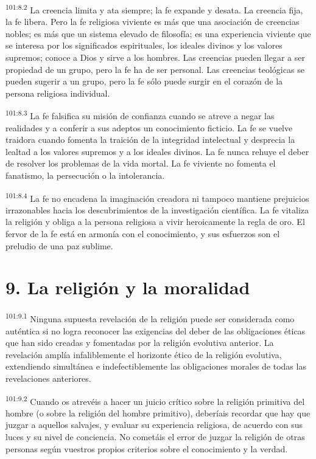 \par
\textsuperscript{101:8.2} La creencia limita y ata siempre; la fe expande y desata. La creencia fija, la fe libera. Pero la fe religiosa viviente es más que una asociación de creencias nobles; es más que un sistema elevado de filosofía; es una experiencia viviente que se interesa por los significados espirituales, los ideales divinos y los valores supremos; conoce a Dios y sirve a los hombres. Las creencias pueden llegar a ser propiedad de un grupo, pero la fe ha de ser personal. Las creencias teológicas se pueden sugerir a un grupo, pero la fe sólo puede surgir en el corazón de la persona religiosa individual.

\par
\textsuperscript{101:8.3} La fe falsifica su misión de confianza cuando se atreve a negar las realidades y a conferir a sus adeptos un conocimiento ficticio. La fe se vuelve traidora cuando fomenta la traición de la integridad intelectual y desprecia la lealtad a los valores supremos y a los ideales divinos. La fe nunca rehuye el deber de resolver los problemas de la vida mortal. La fe viviente no fomenta el fanatismo, la persecución o la intolerancia.

\par
\textsuperscript{101:8.4} La fe no encadena la imaginación creadora ni tampoco mantiene prejuicios irrazonables hacia los descubrimientos de la investigación científica. La fe vitaliza la religión y obliga a la persona religiosa a vivir heroicamente la regla de oro. El fervor de la fe está en armonía con el conocimiento, y sus esfuerzos son el preludio de una paz sublime.

\section*{9. La religión y la moralidad}
\par
\textsuperscript{101:9.1} Ninguna supuesta revelación de la religión puede ser considerada como auténtica si no logra reconocer las exigencias del deber de las obligaciones éticas que han sido creadas y fomentadas por la religión evolutiva anterior. La revelación amplía infaliblemente el horizonte ético de la religión evolutiva, extendiendo simultánea e indefectiblemente las obligaciones morales de todas las revelaciones anteriores.

\par
\textsuperscript{101:9.2} Cuando os atrevéis a hacer un juicio crítico sobre la religión primitiva del hombre (o sobre la religión del hombre primitivo), deberíais recordar que hay que juzgar a aquellos salvajes, y evaluar su experiencia religiosa, de acuerdo con sus luces y su nivel de conciencia. No cometáis el error de juzgar la religión de otras personas según vuestros propios criterios sobre el conocimiento y la verdad.

